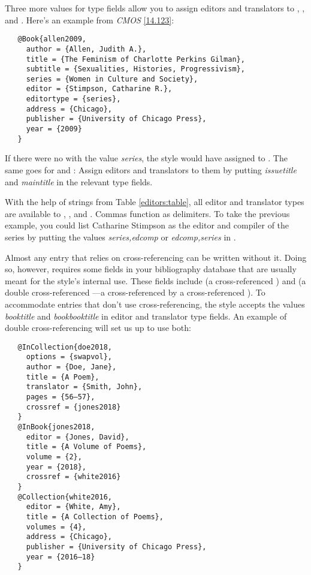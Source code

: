 \documentclass[11pt,letterpaper,oneside]{article}
\begin{document}
Three more values for type fields allow you to assign editors and
translators to , , and
. Here's an example from \textit{CMOS}
\ref{14.123}:

\begin{verbatim}
   @Book{allen2009,
     author = {Allen, Judith A.},
     title = {The Feminism of Charlotte Perkins Gilman},
     subtitle = {Sexualities, Histories, Progressivism},
     series = {Women in Culture and Society},
     editor = {Stimpson, Catharine R.},
     editortype = {series},
     address = {Chicago},
     publisher = {University of Chicago Press},
     year = {2009}
   }
\end{verbatim}

\begin{citebib}
\item \cite{allen2009}
\end{citebib}

\noindent If there were no  with the value
\textit{series}, the style would have assigned  to
. The same goes for  and
: Assign editors and translators to them by
putting \textit{issuetitle} and \textit{maintitle} in the relevant
type fields.

With the help of strings from Table \ref{editors:table}, all editor and
translator types are available to ,
, and . Commas function as
delimiters. To take the previous example, you could list Catharine
Stimpson as the editor and compiler of the series by putting the
values \textit{series,edcomp} or \textit{edcomp,series} in
.

Almost any entry that relies on cross-referencing can be written
without it. Doing so, however, requires some fields in your
bibliography database that are usually meant for the style's internal
use. These fields include  (a cross-referenced
) and  (a double
cross-referenced ---a 
cross-referenced by a cross-referenced ). To
accommodate entries that don't use cross-referencing, the style
accepts the values \textit{booktitle} and \textit{bookbooktitle} in
editor and translator type fields. An example of double
cross-referencing will set us up to use both:

\begin{verbatim}
   @InCollection{doe2018,
     options = {swapvol},
     author = {Doe, Jane},
     title = {A Poem},
     translator = {Smith, John},
     pages = {56–57},
     crossref = {jones2018}
   }
   @InBook{jones2018,
     editor = {Jones, David},
     title = {A Volume of Poems},
     volume = {2},
     year = {2018},
     crossref = {white2016}
   }
   @Collection{white2016,
     editor = {White, Amy},
     title = {A Collection of Poems},
     volumes = {4},
     address = {Chicago},
     publisher = {University of Chicago Press},
     year = {2016–18}
   }
\end{verbatim}
\end{document}
